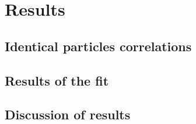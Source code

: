 \chapter{Results}
  \section{Identical particles correlations}
  \section{Results of the fit}
  \section{Discussion of results}

